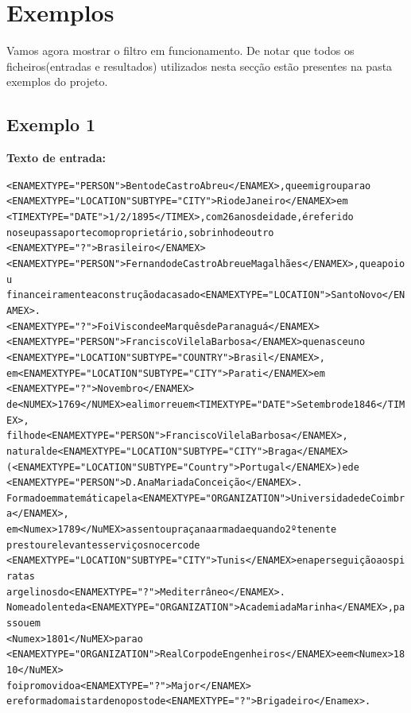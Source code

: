 \documentclass[11pt,a4paper]{article}
\begin{document}
\section{Exemplos}

Vamos agora mostrar o filtro em funcionamento. De notar que todos os ficheiros(entradas e resultados) utilizados nesta secção estão presentes na pasta exemplos do projeto.

\subsection*{Exemplo 1}

\textbf{Texto de entrada:}

\begin{alltt}
<ENAMEX TYPE="PERSON"> Bento de Castro Abreu </ENAMEX>, que emigrou para o 
<ENAMEX TYPE="LOCATION" SUBTYPE="CITY"> Rio de Janeiro </ENAMEX> em 
<TIMEX TYPE="DATE"> 1/2/1895 </TIMEX>, com 26 anos de idade, é referido
no seu passaporte como proprietário, sobrinho de outro 
<ENAMEX TYPE="?"> Brasileiro </ENAMEX> 
<ENAMEX TYPE="PERSON"> Fernando de Castro Abreu e Magalhães </ENAMEX>, que apoiou 
financeiramente a construção da casa do <ENAMEX TYPE="LOCATION"> Santo Novo </ENAMEX>.
<ENAMEX TYPE="?">Foi Visconde e Marquês de Paranaguá</ENAMEX> 
<ENAMEX TYPE="PERSON">Francisco Vilela Barbosa</ENAMEX> que nasceu no 
<ENAMEX TYPE="LOCATION" SUBTYPE="COUNTRY">Brasil</ENAMEX>, 
em <ENAMEX TYPE="LOCATION" SUBTYPE="CITY">Parati</ENAMEX> em 
<ENAMEX TYPE="?">Novembro</ENAMEX> 
de <NUMEX>1769</NUMEX> e ali morreu em <TIMEX TYPE="DATE">Setembro de 1846</TIMEX>, 
filho de <ENAMEX TYPE="PERSON">Francisco Vilela Barbosa</ENAMEX>, 
natural de <ENAMEX TYPE="LOCATION" SUBTYPE="CITY">Braga</ENAMEX> 
(<ENAMEX TYPE="LOCATION" SUBTYPE="Country">Portugal</ENAMEX>) e de 
<ENAMEX TYPE="PERSON">D. Ana Maria da Conceição</ENAMEX>. 
Formado em matemática pela <ENAMEX TYPE="ORGANIZATION">Universidade de Coimbra</ENAMEX>, 
em <Numex>1789</NuMEX> assentou praça na armada e quando 2º tenente 
prestou relevantes serviços no cerco de 
<ENAMEX TYPE="LOCATION" SUBTYPE="CITY">Tunis</ENAMEX> e na perseguição aos piratas 
argelinos do <ENAMEX TYPE="?">Mediterrâneo</ENAMEX>.
Nomeado lente da <ENAMEX TYPE="ORGANIZATION">Academia da Marinha</ENAMEX>, passou em 
<Numex>1801</NuMEX> para o 
<ENAMEX TYPE="ORGANIZATION">Real Corpo de Engenheiros</ENAMEX> e em <Numex>1810</NuMEX> 
foi promovido a <ENAMEX TYPE="?">Major</ENAMEX> 
e reformado mais tarde no posto de <ENAMEX TYPE="?">Brigadeiro</Enamex>.
\end{alltt}
\end{document}

